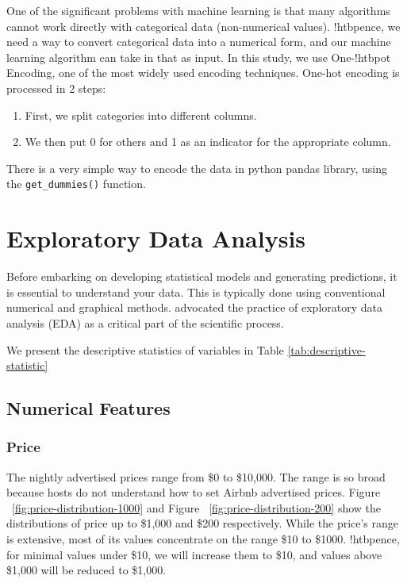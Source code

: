 One of the significant problems with machine learning is that many algorithms
cannot work directly with categorical data (non-numerical values).  !htbpence, we
need a way to convert categorical data into a numerical form, and our machine
learning algorithm can take in that as input. In this study, we use  One-!htbpot
Encoding, one of the most widely used encoding techniques.  One-hot encoding is
processed in 2 steps:
\begin{enumerate}
    \item First, we split categories into different columns.
    \item We then put 0 for others and 1 as an indicator for the appropriate column.
\end{enumerate}

There is a very simple way to encode the data in python pandas library, using
the \texttt{get\_dummies()} function.

\section{Exploratory Data Analysis}

Before embarking on developing statistical models and generating predictions, it
is essential to understand your data. This is typically done using conventional
numerical and graphical methods. \textcite{tukey1977exploratory} advocated the practice
of exploratory data analysis (EDA) as a critical part of the scientific process.

We present the descriptive statistics of variables in Table
\ref{tab:descriptive-statistic}

\subsection{Numerical Features}
\label{sec:numerical_features}

\subsubsection*{Price}

The nightly advertised prices range from \$0 to \$10,000. The range is so broad
because hosts do not understand how to set Airbnb advertised prices.  Figure
~\ref{fig:price-distribution-1000} and Figure ~\ref{fig:price-distribution-200}
 show the distributions of price up to \$1,000 and \$200 respectively. While the
price's range is extensive, most of its values concentrate on the range \$10 to
\$1000.  !htbpence, for minimal values under \$10, we will increase them to \$10,
and values above \$1,000 will be reduced to \$1,000.

